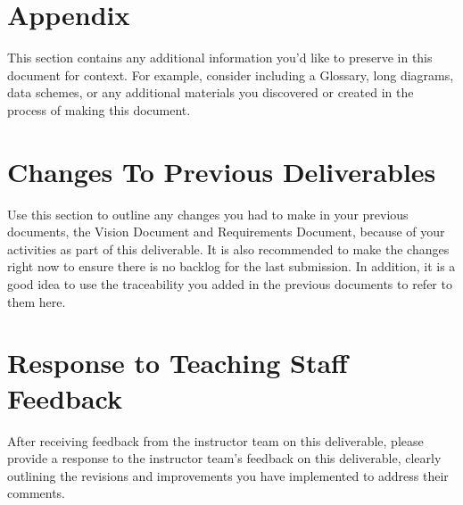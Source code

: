 \section{Appendix}
This section contains any additional information you’d like to preserve in this document for context. For example, consider including a Glossary, long diagrams, data schemes, or any additional materials you discovered or created in the process of making this document.

\section{Changes To Previous Deliverables}
Use this section to outline any changes you had to make in your previous documents, the Vision Document and Requirements Document, because of your activities as part of this deliverable. It is also recommended to make the changes right now to ensure there is no backlog for the last submission. In addition, it is a good idea to use the traceability you added in the previous documents to refer to them here.






\section{Response to Teaching Staff Feedback}
After receiving feedback from the instructor team on this deliverable,
please provide a response to the instructor team’s feedback on this
deliverable, clearly outlining the revisions and improvements you have
implemented to address their comments.

